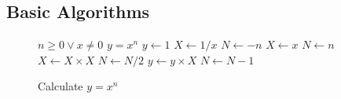 \documentclass[UTF8]{ctexart}
\begin{document}
\subsection{Basic Algorithms}
\lipsum
\begin{figure}
\centering
\begin{minipage}{0.5\linewidth}
  \begin{algorithm}[H]
  \caption{Calculate $y = x^n$}
  \begin{algorithmic}
  \REQUIRE $n \geq 0 \vee x \neq 0$
  \ENSURE $y = x^n$
  \STATE $y \leftarrow 1$
  \STATE $X \leftarrow 1 / x$
  \STATE $N \leftarrow -n$
  \ELSE
  \STATE $X \leftarrow x$
  \STATE $N \leftarrow n$
  \ENDIF
  \STATE $X \leftarrow X \times X$
  \STATE $N \leftarrow N / 2$
  \ELSE[$N$ is odd]
  \STATE $y \leftarrow y \times X$
  \STATE $N \leftarrow N - 1$
  \ENDIF
  \ENDWHILE
  \end{algorithmic}
  \end{algorithm}
\end{minipage}
\end{figure}
\end{document}
